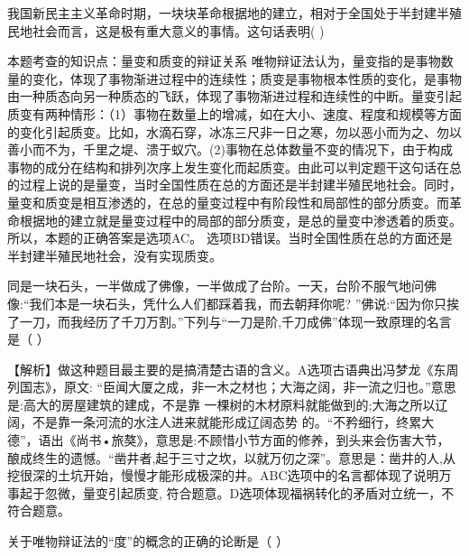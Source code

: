 \question 我国新民主主义革命时期，一块块革命根据地的建立，相对于全国处于半封建半殖民地社会而言，这是极有重大意义的事情。这句话表明(
)
\par{}
\begin{solution}本题考查的知识点：量变和质变的辩证关系
唯物辩证法认为，量变指的是事物数量的变化，体现了事物渐进过程中的连续性；质变是事物根本性质的变化，是事物由一种质态向另一种质态的飞跃，体现了事物渐进过程和连续性的中断。量变引起质变有两种情形：（1）事物在数量上的增减，如在大小、速度、程度和规模等方面的变化引起质变。比如，水滴石穿，冰冻三尺非一日之寒，勿以恶小而为之、勿以善小而不为，千里之堤、溃于蚁穴。(2)事物在总体数量不变的情况下，由于构成事物的成分在结构和排列次序上发生变化而起质变。由此可以判定题干这句话在总的过程上说的是量变，当时全国性质在总的方面还是半封建半殖民地社会。同时，量变和质变是相互渗透的，在总的量变过程中有阶段性和局部性的部分质变。而革命根据地的建立就是量变过程中的局部的部分质变，是总的量变中渗透着的质变。所以，本题的正确答案是选项AC。
选项BD错误。当时全国性质在总的方面还是半封建半殖民地社会，没有实现质变。
\end{solution}
\question 同是一块石头，一半做成了佛像，一半做成了台阶。一天，台阶不服气地问佛像:``我们本是一块石头，凭什么人们都踩着我，而去朝拜你呢?
''佛说:``因为你只挨了一刀，而我经历了千刀万割。''下列与``一刀是阶,千刀成佛''体现一致原理的名言是（
）
\par{}
\begin{solution}【解析】做这种题目最主要的是搞清楚古语的含义。A选项古语典出冯梦龙《东周列国志》，原文:
``臣闻大厦之成，非一木之材也；大海之阔，非一流之归也。''意思是:高大的房屋建筑的建成，不是靠
一棵树的木材原料就能做到的;大海之所以辽阔，不是靠一条河流的水注人进来就能形成辽阔态势
的。``不矜细行，终累大德''，语出《尚书•旅獒》，意思是:不顾惜小节方面的修养，到头来会伤害大节，酿成终生的遗憾。``凿井者,起于三寸之坎，以就万仞之深''。意思是：凿井的人,从挖很深的土坑开始，慢慢才能形成极深的井。ABC选项中的名言都体现了说明万事起于忽微，量变引起质变,
符合题意。D选项体现福祸转化的矛盾对立统一，不符合题意。
\end{solution}
\question 关于唯物辩证法的``度''的概念的正确的论断是（ ）
\par{}
